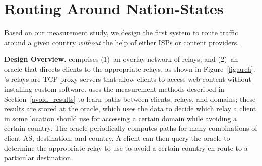 \section{Routing Around Nation-States}
\label{system_design}


Based on our measurement study, we design the first system to route traffic
around a given country {\it without} the help of either ISPs or content providers.  






{\bf Design Overview.} \system{} comprises (1)~an overlay network of relays; and
(2)~an oracle that
directs clients to the appropriate relays, as shown in Figure~\ref{fig:arch}.
\system{}'s relays are TCP proxy servers that allow clients to access web
content without installing custom software. \system{} uses the measurement
methods described in Section~\ref{avoid_results} to learn paths between
clients, relays, and domains; these results are stored at the oracle, which
uses the data to decide which relay a client in some location should use for
accessing a certain domain while avoiding a certain country.  The oracle
periodically computes paths for many combinations of client AS, destination,
and country.   A client can then query the oracle to determine the appropriate
relay to use to avoid a certain country en route to a particular destination.

